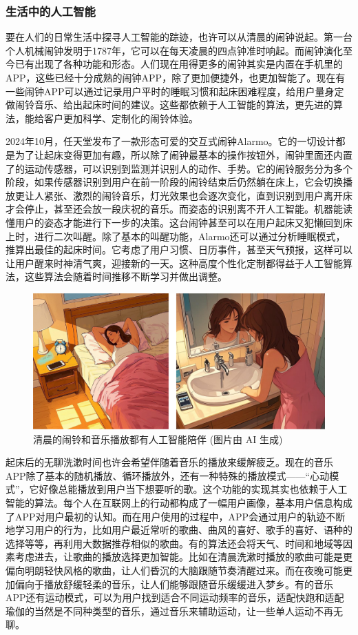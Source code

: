 \subsubsection*{\textbf{生活中的人工智能}}

要在人们的日常生活中探寻人工智能的踪迹，也许可以从清晨的闹钟说起。第一台个人机械闹钟发明于1787年，它可以在每天凌晨的四点钟准时响起。而闹钟演化至今已有出现了各种功能和形态。人们现在用得更多的闹钟其实是内置在手机里的APP，这些已经十分成熟的闹钟APP，除了更加便捷外，也更加智能了。现在有一些闹钟APP可以通过记录用户平时的睡眠习惯和起床困难程度，给用户量身定做闹铃音乐、给出起床时间的建议。这些都依赖于人工智能的算法，更先进的算法，能给客户更加科学、定制化的闹铃体验。

2024年10月，任天堂发布了一款形态可爱的交互式闹钟Alarmo。它的一切设计都是为了让起床变得更加有趣，所以除了闹钟最基本的操作按钮外，闹钟里面还内置了的运动传感器，可以识别到监测并识别人的动作、手势。它的闹铃服务分为多个阶段，如果传感器识别到用户在前一阶段的闹铃结束后仍然躺在床上，它会切换播放更让人紧张、激烈的闹铃音乐，灯光效果也会逐次变化，直到识别到用户离开床才会停止，甚至还会放一段庆祝的音乐。而姿态的识别离不开人工智能。机器能读懂用户的姿态才能进行下一步的决策。这台闹钟甚至可以在用户起床又犯懒回到床上时，进行二次叫醒。除了基本的叫醒功能，Alarmo还可以通过分析睡眠模式，推算出最佳的起床时间。它考虑了用户习惯、日历事件，甚至天气预报，这样可以让用户醒来时神清气爽，迎接新的一天。这种高度个性化定制都得益于人工智能算法，这些算法会随着时间推移不断学习并做出调整。

\begin{figure}[htb]    
	\centering
	\includegraphics[width=\linewidth]{image/0/清晨.png}
	\caption{清晨的闹铃和音乐播放都有人工智能陪伴 (图片由 AI 生成)}
\end{figure}

起床后的无聊洗漱时间也许会希望伴随着音乐的播放来缓解疲乏。现在的音乐APP除了基本的随机播放、循环播放外，还有一种特殊的播放模式——“心动模式”，它好像总能播放到用户当下想要听的歌。这个功能的实现其实也依赖于人工智能的算法。每个人在互联网上的行动都构成了一幅用户画像，基本用户信息构成了APP对用户最初的认知。而在用户使用的过程中，APP会通过用户的轨迹不断地学习用户的行为，比如用户最近常听的歌曲、曲风的喜好、歌手的喜好、语种的选择等等，再利用大数据推荐相似的歌曲。有的算法还会将天气、时间和地域等因素考虑进去，让歌曲的播放选择更加智能。比如在清晨洗漱时播放的歌曲可能是更偏向明朗轻快风格的歌曲，让人们昏沉的大脑跟随节奏清醒过来。而在夜晚可能更加偏向于播放舒缓轻柔的音乐，让人们能够跟随音乐缓缓进入梦乡。有的音乐APP还有运动模式，可以为用户找到适合不同运动频率的音乐，适配快跑和适配瑜伽的当然是不同种类型的音乐，通过音乐来辅助运动，让一些单人运动不再无聊。

